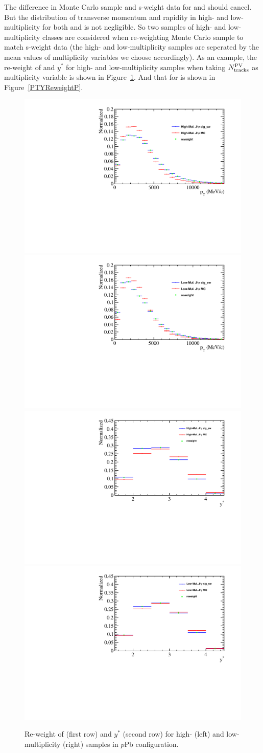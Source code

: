 The difference in Monte Carlo sample and s-weight data for \jpsi and \psitwos should cancel. But the distribution of transverse momentum and rapidity in high- and low- multiplicity for both \jpsi and \psitwos is not negligible. So two samples of high- and low-multiplicity classes are considered when re-weighting Monte Carlo sample to match s-weight data (the high- and low-multiplicity samples are seperated by the mean values of multiplicity variables we choose accordingly). As an example, the re-weight of \pt and $y^*$ for high- and low-multiplicity \jpsi samples when taking $N^{\rm PV}_{\rm tracks}$ as multiplicity variable is shown in Figure~\ref{PTYReweightJ}. And that for \psitwos is shown in Figure~\ref{PTYReweightP}.
\begin{figure}[H]
\begin{center}
\includegraphics[width=0.37\linewidth]{pdf/pPb/Workdir/Reweight/JpsiHighMulPT.pdf}
\includegraphics[width=0.37\linewidth]{pdf/pPb/Workdir/Reweight/JpsiLowMulPT.pdf}
\includegraphics[width=0.37\linewidth]{pdf/pPb/Workdir/Reweight/JpsiHighMulY.pdf}
\includegraphics[width=0.37\linewidth]{pdf/pPb/Workdir/Reweight/JpsiLowMulY.pdf}
\end{center}
\caption{
        Re-weight of \pt (first row) and $y^*$ (second row) for high- (left) and low-multiplicity (right) \jpsi samples in $p$Pb configuration.}
\label{PTYReweightJ}
\end{figure}

